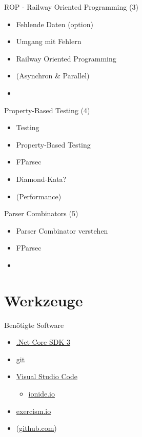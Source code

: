 \documentclass[t]{beamer}
\begin{document}
\begin{frame}[label={sec:org213b58a}]{ROP - Railway Oriented Programming (3)}
\begin{itemize}
\item Fehlende Daten (option)
\item Umgang mit Fehlern
\item Railway Oriented Programming
\item (Asynchron \& Parallel)
\item\relax [Programmieraufgabe!]
\end{itemize}
\end{frame}

\begin{frame}[label={sec:orge3b5361}]{Property-Based Testing (4)}
\begin{itemize}
\item Testing
\item Property-Based Testing
\item FParsec
\item Diamond-Kata?
\item (Performance)
\end{itemize}
\end{frame}

\begin{frame}[label={sec:orgda05852}]{Parser Combinators (5)}
\begin{itemize}
\item Parser Combinator verstehen
\item FParsec
\item\relax [Test!]
\end{itemize}
\end{frame}

\section{Werkzeuge }
\label{sec:org640ca5a}

\begin{frame}[label={sec:orgb80cdaf}]{Benötigte Software}
\begin{itemize}
\item \href{https://dotnet.microsoft.com/download}{.Net Core SDK 3}
\item \href{https://git-scm.com/}{git}
\item \href{https://code.visualstudio.com/}{Visual Studio Code}
\begin{itemize}
\item \href{http://ionide.io/}{ionide.io}
\end{itemize}
\item \href{https://exercism.io/}{exercism.io}
\item (\href{https://github.com/}{github.com})
\end{itemize}
\end{frame}
\end{document}
